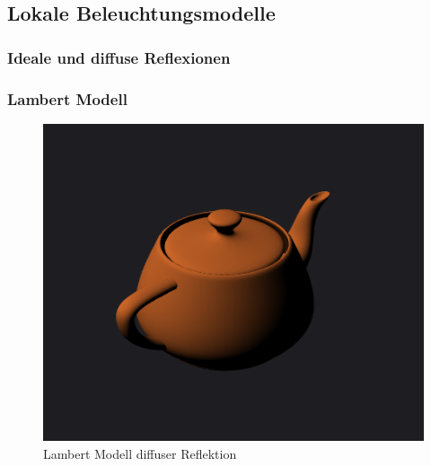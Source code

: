\subsection{Lokale Beleuchtungsmodelle}
\subsubsection{Ideale und diffuse Reflexionen}
\subsubsection{Lambert  Modell}
\begin{figure}[H]
    \centering
    \includegraphics[width=1.0\textwidth]{images/lambert.png}
    \caption{Lambert Modell diffuser Reflektion}
\end{figure}


